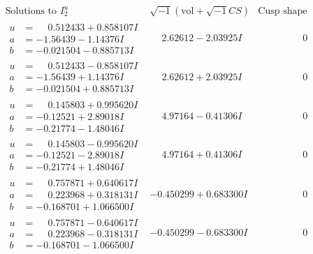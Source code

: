 \documentclass[1p]{elsarticle_modified}
\theoremstyle{definition}
\newcommand{\I}{\sqrt{-1}}
\begin{document}
$$\begin{array}{c|c|c}  
\text{Solutions to }I^u_{2}& \I (\text{vol} + \sqrt{-1}CS) & \text{Cusp shape}\\
 \hline 
\begin{aligned}
u &= \phantom{-}0.512433 + 0.858107 I \\
a &= -1.56439 - 1.14376 I \\
b &= -0.021504 - 0.885713 I\end{aligned}
 & \phantom{-}2.62612 - 2.03925 I & \phantom{-0.000000 } 0 \\ \hline\begin{aligned}
u &= \phantom{-}0.512433 - 0.858107 I \\
a &= -1.56439 + 1.14376 I \\
b &= -0.021504 + 0.885713 I\end{aligned}
 & \phantom{-}2.62612 + 2.03925 I & \phantom{-0.000000 } 0 \\ \hline\begin{aligned}
u &= \phantom{-}0.145803 + 0.995620 I \\
a &= -0.12521 + 2.89018 I \\
b &= -0.21774 - 1.48046 I\end{aligned}
 & \phantom{-}4.97164 - 0.41306 I & \phantom{-0.000000 } 0 \\ \hline\begin{aligned}
u &= \phantom{-}0.145803 - 0.995620 I \\
a &= -0.12521 - 2.89018 I \\
b &= -0.21774 + 1.48046 I\end{aligned}
 & \phantom{-}4.97164 + 0.41306 I & \phantom{-0.000000 } 0 \\ \hline\begin{aligned}
u &= \phantom{-}0.757871 + 0.640617 I \\
a &= \phantom{-}0.223968 + 0.318131 I \\
b &= -0.168701 + 1.066500 I\end{aligned}
 & -0.450299 + 0.683300 I & \phantom{-0.000000 } 0 \\ \hline\begin{aligned}
u &= \phantom{-}0.757871 - 0.640617 I \\
a &= \phantom{-}0.223968 - 0.318131 I \\
b &= -0.168701 - 1.066500 I\end{aligned}
 & -0.450299 - 0.683300 I & \phantom{-0.000000 } 0 \\ \hline\begin{aligned}

\end{aligned}
\end{array}$$
\end{document}
